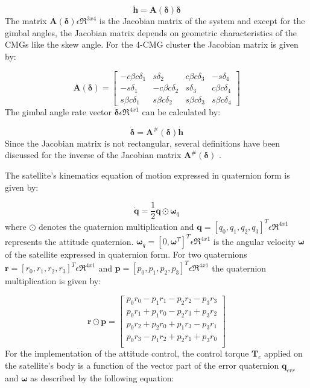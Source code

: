 \documentclass[aerospace,article,submit,moreauthors,dvi2pdf]{Definitions/mdpi}
\begin{document}
\begin{equation}
   \dot{ \textbf{h}}=\textbf{A}(\boldsymbol{\delta})\dot{\boldsymbol{\delta}}
\end{equation}
The matrix $\textbf{A}(\boldsymbol{\delta})\epsilon\Re^{3x4} $ is the Jacobian matrix of the system and except for the gimbal angles, the Jacobian matrix depends on geometric characteristics of the CMGs like the skew angle. For the 4-CMG cluster the Jacobian matrix is given by:

\begin{equation}
\textbf{A}(\boldsymbol{\delta})=
\begin{bmatrix}
-c\beta c\delta_{1} & s\delta_{2} & c\beta c\delta_{3} & -s\delta_{4}\\
-s\delta_{1} & -c\beta c\delta_{2} & s\delta_{3} & c\beta c\delta_{4}\\
s\beta c\delta_{1} & s\beta c\delta_{2} & s\beta c\delta_{3} & s\beta c\delta_{4}
\end{bmatrix}
\end{equation}
The gimbal angle rate vector $\boldsymbol{\dot{\delta}}\epsilon\Re^{4x1}$ can be calculated by:

\begin{equation}
\label{eq:inverse}
   \dot{\boldsymbol{\delta}}=\textbf{A}^\#(\boldsymbol{\delta}) \dot{ \textbf{h}}
\end{equation}
Since the Jacobian matrix is not rectangular, several definitions have been discussed for the inverse of the Jacobian matrix $\textbf{A}^\#(\boldsymbol{\delta})$ \cite{bongwie2001}.

The satellite's kinematics equation of motion expressed in quaternion form is given by:

\begin{equation}
\dot{\textbf{q}}=\frac{1}{2}\textbf{q}\odot\boldsymbol{\omega}_q
\label{eq:quaternion_dot}
\end{equation}
where $\odot$ denotes the quaternion multiplication and $\textbf{q}=[q_0, q_1, q_2, q_3]^T\epsilon\Re^{4x1}$ represents the attitude quaternion. $\boldsymbol{\omega}_q=[0,\boldsymbol{\omega}^T]^T\epsilon\Re^{4x1}$ is the angular velocity $\boldsymbol{\omega}$ of the satellite expressed in quaternion form. For two quaternions $\textbf{r}=[r_0,r_1,r_2,r_3]^T\epsilon\Re^{4x1}$ and $\textbf{p}=[p_0,p_1,p_2,p_3]^T\epsilon\Re^{4x1}$ the quaternion multiplication is given by:

\begin{equation}
\textbf{r} \odot \textbf{p} =
\begin{bmatrix}
p_0r_0 - p_1r_1 - p_2r_2 - p_3r_3\\
 p_0r_1 + p_1r_0 - p_2r_3 + p_3r_2\\
 p_0r_2 + p_2r_0 + p_1r_3 - p_3r_1\\
 p_0r_3 - p_1r_2 + p_2r_1 + p_3r_0\\
\end{bmatrix}
\end{equation}
For the implementation of the attitude control, the control torque $\textbf{T}_c$ applied on the satellite's body is a function of the vector part of the error quaternion $\textbf{q}_{err}$ and $\boldsymbol{\omega}$ as described by the following equation:
\end{document}
